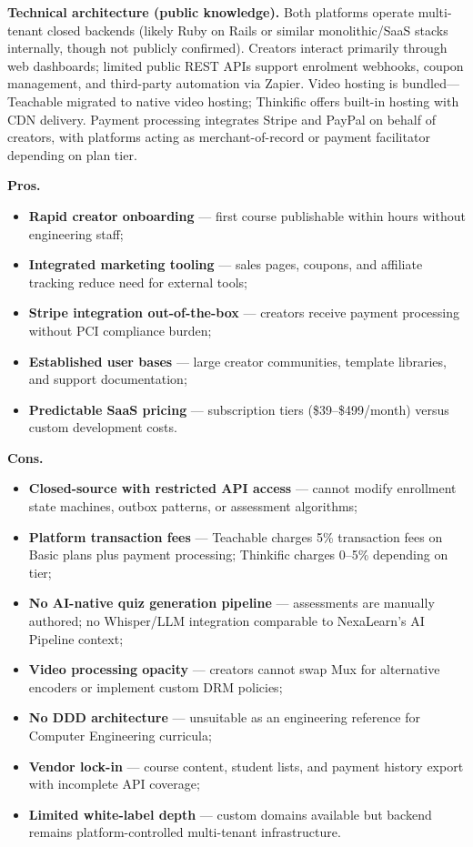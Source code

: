 \textbf{Technical architecture (public knowledge).}
Both platforms operate multi-tenant closed backends (likely Ruby on Rails or similar monolithic/SaaS stacks internally, though not publicly confirmed). Creators interact primarily through web dashboards; limited public REST APIs support enrolment webhooks, coupon management, and third-party automation via Zapier. Video hosting is bundled---Teachable migrated to native video hosting; Thinkific offers built-in hosting with CDN delivery. Payment processing integrates Stripe and PayPal on behalf of creators, with platforms acting as merchant-of-record or payment facilitator depending on plan tier.

\textbf{Pros.}
\begin{itemize}
  \item \textbf{Rapid creator onboarding} --- first course publishable within hours without engineering staff;
  \item \textbf{Integrated marketing tooling} --- sales pages, coupons, and affiliate tracking reduce need for external tools;
  \item \textbf{Stripe integration out-of-the-box} --- creators receive payment processing without PCI compliance burden;
  \item \textbf{Established user bases} --- large creator communities, template libraries, and support documentation;
  \item \textbf{Predictable SaaS pricing} --- subscription tiers (\$39--\$499/month) versus custom development costs.
\end{itemize}

\textbf{Cons.}
\begin{itemize}
  \item \textbf{Closed-source with restricted API access} --- cannot modify enrollment state machines, outbox patterns, or assessment algorithms;
  \item \textbf{Platform transaction fees} --- Teachable charges 5\% transaction fees on Basic plans plus payment processing; Thinkific charges 0--5\% depending on tier;
  \item \textbf{No AI-native quiz generation pipeline} --- assessments are manually authored; no Whisper/LLM integration comparable to NexaLearn's AI Pipeline context;
  \item \textbf{Video processing opacity} --- creators cannot swap Mux for alternative encoders or implement custom DRM policies;
  \item \textbf{No DDD architecture} --- unsuitable as an engineering reference for Computer Engineering curricula;
  \item \textbf{Vendor lock-in} --- course content, student lists, and payment history export with incomplete API coverage;
  \item \textbf{Limited white-label depth} --- custom domains available but backend remains platform-controlled multi-tenant infrastructure.
\end{itemize}

